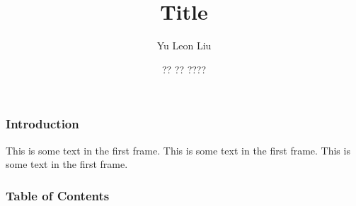\documentclass{beamer}
\title[About Beamer]{Title}
\author{Yu Leon Liu}
\institute{Harvard University}
\date{?? ?? ????}
\begin{document}
\frame{\titlepage}

\begin{frame}
\frametitle{Introduction}
This is some text in the first frame. This is some text in the first frame. This is some text in the first frame.
\end{frame}


\begin{frame}
    \frametitle{Table of Contents}
    \tableofcontents
    \end{frame}
\end{document}
